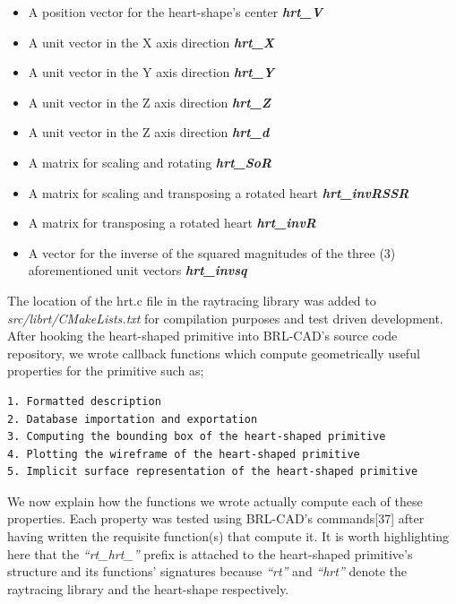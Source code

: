 \begin{itemize}
\item A position vector for the heart-shape's center \textbf{\textit{hrt\_V}}  
\item A unit vector in the X ­axis direction \textbf{\textit{hrt\_X}}  
\item A unit vector in the Y axis direction \textbf{\textit{hrt\_Y}}  
\item A unit vector in the Z axis direction \textbf{\textit{hrt\_Z}}  
\item A unit vector in the Z ­axis direction \textit{\textbf{hrt\_d}}  
\item A matrix for scaling and rotating \textit{\textbf{hrt\_SoR}}  
\item A matrix for scaling and transposing a rotated heart \textbf{\textit{hrt\_invRSSR}}  
\item A matrix for transposing a rotated heart \textit{\textbf{hrt\_invR}}  
\item A vector for the inverse of the squared magnitudes of the three (3) aforementioned unit vectors \textit{\textbf{hrt\_invsq}}  
\end{itemize}

The   location   of   the   hrt.c   file   in   the   raytracing   library   was   added   to  
\textit{src/librt/CMakeLists.txt} for compilation purposes  and test ­driven development.\\
   
\hspace{30} After   hooking   the   heart-­shaped   primitive   into   BRL-­CAD's   source   code  
repository,   we   wrote   callback   functions   which   compute   geometrically   useful  
properties for the primitive such as;   
\begin{verbatim}
1. Formatted description  
2. Database importation and exportation  
3. Computing the bounding box of the heart­-shaped primitive  
4. Plotting the wireframe of the heart­-shaped primitive  
5. Implicit surface representation of the heart-­shaped primitive  
\end{verbatim}

\hspace{30} We   now   explain   how   the   functions   we   wrote   actually   compute   each
of   these properties.   Each   property   was   tested   using   BRL-­CAD's   commands[37]   after  having   
written   the   requisite   function(s)   that   compute   it.   It   is   worth   highlighting  
here   that   the   \textit{“rt\_hrt\_”}   prefix   is   attached   to   the   heart­-shaped   primitive's   structure  
and   its   functions'   signatures   because   \textit{“rt”}   and   \textit{“hrt”}   denote   the   raytracing   library  
and the heart-shape respectively.  

